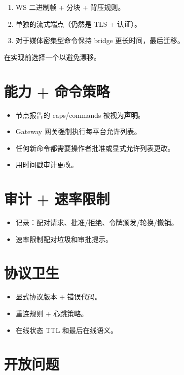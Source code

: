 \begin{enumerate}
  \item WS 二进制帧 + 分块 + 背压规则。
  \item 单独的流式端点（仍然是 TLS + 认证）。
  \item 对于媒体密集型命令保持 bridge 更长时间，最后迁移。
\end{enumerate}


在实现前选择一个以避免漂移。

\section{能力 + 命令策略}


\begin{itemize}
  \item 节点报告的 caps/commands 被视为\textbf{声明}。
  \item Gateway 网关强制执行每平台允许列表。
  \item 任何新命令都需要操作者批准或显式允许列表更改。
  \item 用时间戳审计更改。
\end{itemize}


\section{审计 + 速率限制}


\begin{itemize}
  \item 记录：配对请求、批准/拒绝、令牌颁发/轮换/撤销。
  \item 速率限制配对垃圾和审批提示。
\end{itemize}


\section{协议卫生}


\begin{itemize}
  \item 显式协议版本 + 错误代码。
  \item 重连规则 + 心跳策略。
  \item 在线状态 TTL 和最后在线语义。
\end{itemize}


\hrulefill


\section{开放问题}


